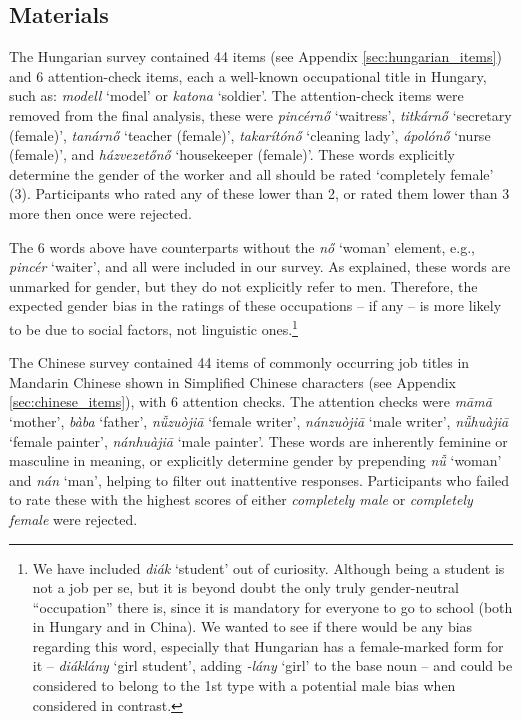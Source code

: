 \documentclass[11pt]{article}
\newcommand{\zh}[1]{\simplifiedchinesefont{#1}\rmfamily}
\begin{document}
\subsection{Materials}

The Hungarian survey contained 44 items (see Appendix \ref{sec:hungarian_items}) and 6 attention-check items, each a well-known occupational title in Hungary, such as: \textit{modell} `model' or \textit{katona} `soldier'. The attention-check items were removed from the final analysis, these were \textit{pincérnő} `waitress', \textit{titkárnő} `secretary (female)', \textit{tanárnő} `teacher (female)', \textit{takarítónő} `cleaning lady', \textit{ápolónő} `nurse (female)', and \textit{házvezetőnő} `housekeeper (female)'. These words explicitly determine the gender of the worker and all should be rated `completely female' (3). Participants who rated any of these lower than 2, or rated them lower than 3 more then once were rejected.

The 6 words above have counterparts without the \textit{nő} `woman' element, e.g., \textit{pincér} `waiter', and all were included in our survey. As explained, these words are unmarked for gender, but they do not explicitly refer to men. Therefore, the expected gender bias in the ratings of these occupations -- if any -- is more likely to be due to social factors, not linguistic ones.\footnote{We have included \textit{diák} `student' out of curiosity. Although being a student is not a job per se, but it is beyond doubt the only truly gender-neutral ``occupation'' there is, since it is mandatory for everyone to go to school (both in Hungary and in China). We wanted to see if there would be any bias regarding this word, especially that Hungarian has a female-marked form for it -- \textit{diáklány} `girl student', adding \textit{-lány} `girl' to the base noun -- and could be considered to belong to the 1st type with a potential male bias when considered in contrast.}

The Chinese survey contained 44 items of commonly occurring job titles in Mandarin Chinese shown in Simplified Chinese characters (see Appendix \ref{sec:chinese_items}), with 6 attention checks. The attention checks were \zh{妈妈} \textit{māmā} `mother', \zh{爸爸} \textit{bàba} `father', \zh{女作家} \textit{nǚzuòjiā} `female writer', \zh{男作家} \textit{nánzuòjiā} `male writer', \zh{女画家} \textit{nǚhuàjiā} `female painter', \zh{男画家} \textit{nánhuàjiā} `male painter'. These words are inherently feminine or masculine in meaning, or explicitly determine gender by prepending \zh{女} \textit{nǚ} `woman' and \zh{男} \textit{nán} `man', helping to filter out inattentive responses. Participants who failed to rate these with the highest scores of either \textit{completely male} or \textit{completely female} were rejected.
\end{document}

